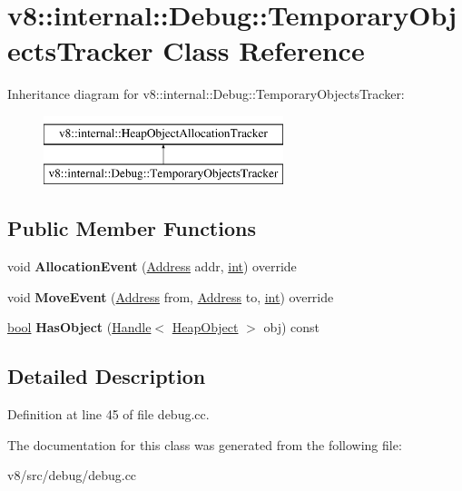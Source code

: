 \hypertarget{classv8_1_1internal_1_1Debug_1_1TemporaryObjectsTracker}{}\section{v8\+:\+:internal\+:\+:Debug\+:\+:Temporary\+Objects\+Tracker Class Reference}
\label{classv8_1_1internal_1_1Debug_1_1TemporaryObjectsTracker}
Inheritance diagram for v8\+:\+:internal\+:\+:Debug\+:\+:Temporary\+Objects\+Tracker\+:\begin{figure}[H]
\begin{center}
\leavevmode
\includegraphics[height=2.000000cm]{classv8_1_1internal_1_1Debug_1_1TemporaryObjectsTracker}
\end{center}
\end{figure}
\subsection*{Public Member Functions}
\begin{DoxyCompactItemize}
\item 
\mbox{\label{classv8_1_1internal_1_1Debug_1_1TemporaryObjectsTracker_aea8ddd847299d92cf55da08cf546329c}} 
void {\bfseries Allocation\+Event} (\mbox{\hyperlink{classuintptr__t}{Address}} addr, \mbox{\hyperlink{classint}{int}}) override
\item 
\mbox{\label{classv8_1_1internal_1_1Debug_1_1TemporaryObjectsTracker_aa104df2dfee5be35cd139c3b1e80b719}} 
void {\bfseries Move\+Event} (\mbox{\hyperlink{classuintptr__t}{Address}} from, \mbox{\hyperlink{classuintptr__t}{Address}} to, \mbox{\hyperlink{classint}{int}}) override
\item 
\mbox{\label{classv8_1_1internal_1_1Debug_1_1TemporaryObjectsTracker_af0c19344ef1c8d9755a757d0a52a3a9e}} 
\mbox{\hyperlink{classbool}{bool}} {\bfseries Has\+Object} (\mbox{\hyperlink{classv8_1_1internal_1_1Handle}{Handle}}$<$ \mbox{\hyperlink{classv8_1_1internal_1_1HeapObject}{Heap\+Object}} $>$ obj) const
\end{DoxyCompactItemize}


\subsection{Detailed Description}


Definition at line 45 of file debug.\+cc.



The documentation for this class was generated from the following file\+:\begin{DoxyCompactItemize}
\item 
v8/src/debug/debug.\+cc\end{DoxyCompactItemize}
